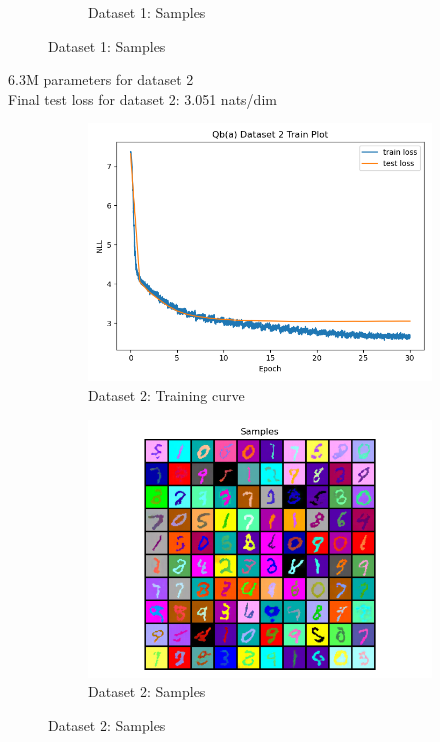 \documentclass{article}
\begin{document}
\begin{enumerate}[(a)]
\begin{figure}[H]
\begin{subfigure}{0.4\textwidth}
        \caption{Dataset 1: Samples}
    \end{subfigure}
\end{figure}
6.3M parameters for dataset 2 \\
Final test loss for dataset 2: 3.051 nats/dim
\begin{figure}[H]
    \centering
    \begin{subfigure}{0.4\textwidth}
        \centering
        \includegraphics[width=\textwidth]{figures/q4_b_dset2_train_plot.png}
        \caption{Dataset 2: Training curve}
    \end{subfigure}
    \hspace{0.2in}
    \begin{subfigure}{0.4\textwidth}
        \centering
        \includegraphics[width=\textwidth]{figures/q4_b_dset2_samples.png}
        \caption{Dataset 2: Samples}
    \end{subfigure}
\end{figure}

\end{enumerate}
\end{document}
